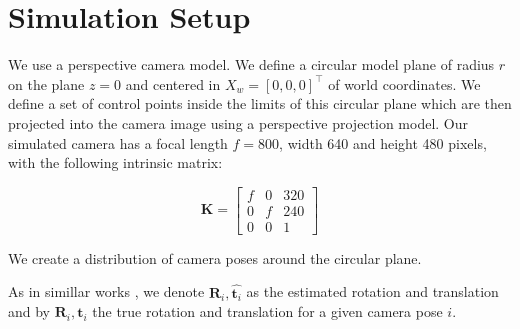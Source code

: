 \documentclass[letterpaper, 10 pt, conference]{ieeeconf}  %
\begin{document}
	
	
	
	
	
	
	
	
	\section{Simulation Setup}
	\label{SimSetup}
	
	We use a perspective camera model. We define a circular model plane of radius $r$ on the plane $z=0$ and centered in $X_w =[0,0,0]^\top$ of world coordinates. We define a set of control points inside the limits of this circular plane which are then projected into the camera image using a perspective projection model. Our simulated camera has a focal length $f=800$, width 640 and height 480 pixels, with the following intrinsic matrix:
	
	\begin{equation}
	\textbf{K} = \begin{bmatrix}
	f & 0 & 320 \\
	0 & f & 240 \\
	0 & 0 & 1
	\end{bmatrix}
	\end{equation}
	
	
	We create a distribution of camera poses around the circular plane.
	
	As in simillar works \cite{Lepetit2008,Collins2014}, we denote $\hat{\textbf{R}}_i, \hat{\textbf{t}_i}$ as the estimated rotation and translation and by $\textbf{R}_i, \textbf{t}_i$ the true rotation and translation for a given camera pose $i$.
	
\end{document}
